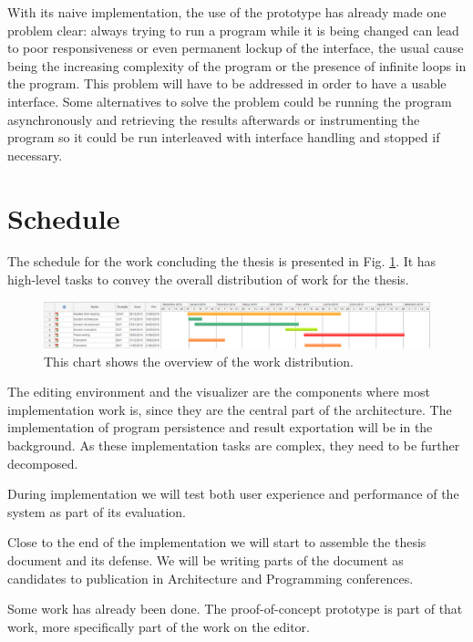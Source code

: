 \documentclass{./llncs2e/llncs}
\begin{document}
	With its naive implementation, the use of the prototype has already made one problem clear: always trying to run a program while it is being changed can lead to poor responsiveness or even permanent lockup of the interface, the usual cause being the increasing complexity of the program or the presence of infinite loops in the program. 
	This problem will have to be addressed in order to have a usable interface. 
	Some alternatives to solve the problem could be running the program asynchronously and retrieving the results afterwards or instrumenting the program so it could be run interleaved with interface handling and stopped if necessary.

\section{Schedule}
	The schedule for the work concluding the thesis is presented in Fig. \ref{fig:schedule}.
	It has high-level tasks to convey the overall distribution of work for the thesis.
	
	\begin{figure}
		\centering
		\includegraphics[width=1.0\textwidth]{img/schedule}
		\caption{This chart shows the overview of the work distribution.}
		\label{fig:schedule}
	\end{figure}
	
	The editing environment and the visualizer are the components where most implementation work is, since they are the central part of the architecture.
	The implementation of program persistence and result exportation will be in the background.
	As these implementation tasks are complex, they need to be further decomposed.
	
	During implementation we will test both user experience and performance of the system as part of its evaluation.
	
	Close to the end of the implementation we will start to assemble the thesis document and its defense.
	We will be writing parts of the document as candidates to publication in Architecture and Programming conferences.
	
	Some work has already been done.
	The proof-of-concept prototype is part of that work, more specifically part of the work on the editor.
		
\end{document}
